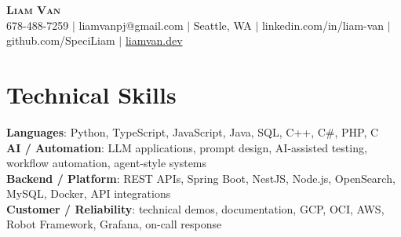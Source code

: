\documentclass[letterpaper,11pt]{article}
\begin{document}

%
\begin{center}
    \textbf{\Huge \scshape Liam Van} \\ \vspace{1pt}
    \small 678-488-7259 $|$ \small {liamvanpj@gmail.com} $|$ Seattle, WA
 {{$|$ linkedin.com/in/liam-van} {$|$ github.com/SpeciLiam} {$|$ \href{https://liamvan.dev}{liamvan.dev}}}

\end{center}

\section{Technical Skills}
 \begin{itemize}[leftmargin=0.15in, label={}]
    \small{\item{
     \textbf{Languages}{: Python, TypeScript, JavaScript, Java, SQL, C++, C\#, PHP, C} \\
     \textbf{AI / Automation}{: LLM applications, prompt design, AI-assisted testing, workflow automation, agent-style systems} \\
     \textbf{Backend / Platform}{: REST APIs, Spring Boot, NestJS, Node.js, OpenSearch, MySQL, Docker, API integrations} \\
     \textbf{Customer / Reliability}{: technical demos, documentation, GCP, OCI, AWS, Robot Framework, Grafana, on-call response} \\
    }}
 \end{itemize}
%

\end{document}
